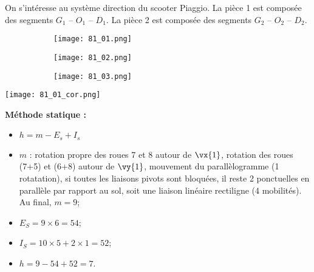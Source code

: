 \normaltrue \difficilefalse \tdifficilefalse
\correctiontrue

\setcounter{question}{0}%


\ifcorrection
\else
{}
\fi


\ifprof
\else
On s'intéresse au système direction du scooter Piaggio. 
La pièce 1 est composée des segments $G_1$ -- $O_1$ -- $D_1$.
La pièce 2 est composée des segments $G_2$ -- $O_2$ -- $D_2$.

\begin{figure*}[!h]
\centering
\begin{subfigure}[c]{.3\linewidth}
\centering
\texttt{[image: 81\_01.png]}
\end{subfigure} \hfill
\begin{subfigure}[c]{.3\linewidth}
\centering
\texttt{[image: 81\_02.png]}
\end{subfigure} \hfill
\begin{subfigure}[c]{.3\linewidth}
\centering
\texttt{[image: 81\_03.png]}
\end{subfigure} 
\end{figure*}
\fi

\ifprof
\begin{center}
\texttt{[image: 81\_01\_cor.png]}
\end{center}
\else
\fi

\ifprof

\textbf{Méthode statique :}
\begin{itemize}
\item $h = m -E_s + I_s$ 
\item $m$ : rotation propre des roues 7 et 8 autour de $\vx{1}$, rotation des roues (7+5) et (6+8) autour de $\vy{1}$,  mouvement du parallèlogramme (1 rotatation), si toutes les liaisons pivots sont bloquées, il reste 2 ponctuelles en parallèle par rapport au sol, soit une liaison linéaire rectiligne (4 mobilités). Au final, $m=9$;
\item $E_S =9\times 6 = 54$;
\item $I_S = 10\times 5 + 2 \times 1 = 52$;
\item $h = 9 -54 + 52 = 7$.
\end{itemize}

